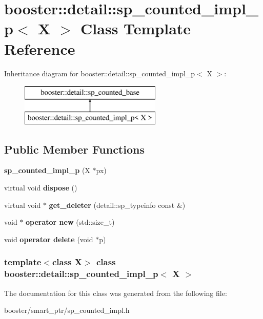 \section{booster\-:\-:detail\-:\-:sp\-\_\-counted\-\_\-impl\-\_\-p$<$ \-X $>$ \-Class \-Template \-Reference}
\label{classbooster_1_1detail_1_1sp__counted__impl__p}
\-Inheritance diagram for booster\-:\-:detail\-:\-:sp\-\_\-counted\-\_\-impl\-\_\-p$<$ \-X $>$\-:\begin{figure}[H]
\begin{center}
\leavevmode
\includegraphics[height=2.000000cm]{classbooster_1_1detail_1_1sp__counted__impl__p}
\end{center}
\end{figure}
\subsection*{\-Public \-Member \-Functions}
\begin{DoxyCompactItemize}
\item 
{\bfseries sp\-\_\-counted\-\_\-impl\-\_\-p} (\-X $\ast$px)\label{classbooster_1_1detail_1_1sp__counted__impl__p_a99b31848393c18b1fb789e4c06f92f83}

\item 
virtual void {\bfseries dispose} ()\label{classbooster_1_1detail_1_1sp__counted__impl__p_a7ef73e7619b003920e0e9b550f22df1d}

\item 
virtual void $\ast$ {\bfseries get\-\_\-deleter} (detail\-::sp\-\_\-typeinfo const \&)\label{classbooster_1_1detail_1_1sp__counted__impl__p_a6085f84628eb386305c8c4fd9cfb4701}

\item 
void $\ast$ {\bfseries operator new} (std\-::size\-\_\-t)\label{classbooster_1_1detail_1_1sp__counted__impl__p_af4e588d7cd60223036e738dbc819efeb}

\item 
void {\bfseries operator delete} (void $\ast$p)\label{classbooster_1_1detail_1_1sp__counted__impl__p_a011c5b981adb2dc4b31886c9701381b9}

\end{DoxyCompactItemize}
\subsubsection*{template$<$class X$>$ class booster\-::detail\-::sp\-\_\-counted\-\_\-impl\-\_\-p$<$ X $>$}



\-The documentation for this class was generated from the following file\-:\begin{DoxyCompactItemize}
\item 
booster/smart\-\_\-ptr/sp\-\_\-counted\-\_\-impl.\-h\end{DoxyCompactItemize}
